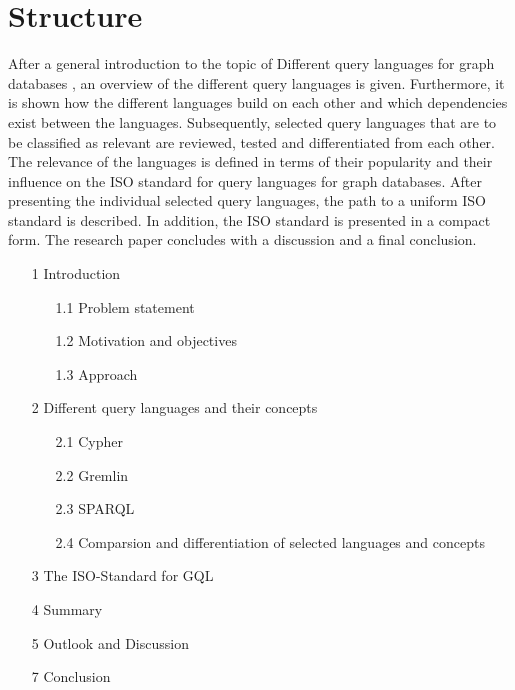 \chapter{Structure}
\label{sec:intro:Structure}
After a general introduction to the topic of \glqq Different query languages for graph databases \grqq{}, 
an overview of the different query languages is given. 
Furthermore, it is shown how the different languages build on each other and which dependencies exist between the languages.
Subsequently, selected query languages that are to be classified as relevant are reviewed, 
tested and differentiated from each other.
The relevance of the languages is defined in terms of their popularity and their influence on the ISO standard for query languages for graph databases.
After presenting the individual selected query languages, the path to a uniform ISO standard is described. 
In addition, the ISO standard is presented in a compact form.
The research paper concludes with a discussion and a final conclusion.

\begin{itemize}
	\item[1] Introduction
	\begin{itemize}
		\item[1.1] Problem statement
		\item[1.2] Motivation and objectives
		\item[1.3] Approach
	\end{itemize}
	\item[2] Different query languages and their concepts
	\begin{itemize}
		\item[2.1] Cypher
		\item[2.2] Gremlin
		\item[2.3] SPARQL
		\item[2.4] Comparsion and differentiation of selected languages and concepts 
	\end{itemize}
	\item[3] The ISO-Standard for GQL
	\item[4] Summary
	\item[5] Outlook and Discussion
	\item[7] Conclusion
\end{itemize}


